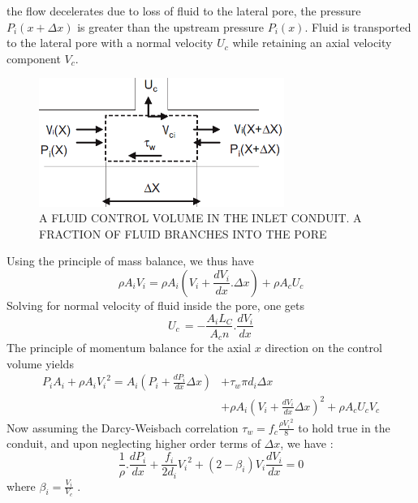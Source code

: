 \documentclass[twocolumn,10pt,cleanfoot]{ihmtc}
\begin{document}
the flow decelerates due to loss of fluid to the lateral pore, the
pressure $P_i(x+\Delta x)$ is greater than the upstream pressure
$P_i(x)$. Fluid is transported to the lateral pore with a normal
velocity $U_c$ while retaining an axial velocity component $V_c$. 
%
\begin{figure}[ht]
\centerline{\includegraphics[width=80mm,scale=0.50]{inletcon.PNG}}
\vspace{-1.5ex}
\caption{\small{A FLUID CONTROL VOLUME IN THE INLET CONDUIT. A FRACTION OF FLUID BRANCHES INTO THE PORE}}
\label{inletcon}
\vspace{-3em}
\end{figure}
%
Using the principle of mass balance, we thus
have%
\begin{equation} \label{in-mass}
\rho {{A}_{i}}{{V}_{i}}=\rho {{A}_{i}}({{V}_{i}}+\frac{d{{V}_{i}}}{dx}.\Delta x)+\rho {{A}_{c}}{{U}_{c}}
\end{equation}
%
Solving for normal velocity of fluid inside the pore, one gets
%
\begin{equation} \label{in-uc}
{{U}_{c}}\,=-\frac{{{A}_{i}}L_C}{{{A}_{c}}n}.\frac{d{{V}_{i}}}{dx} 
\end{equation}
%
The principle of momentum balance for the axial $x$ direction on the control volume yields
%
\begin{equation} \label{in-mom}
\begin{split}
{{P}_{i}}A_i+\rho {{A}_{i}}{{V}_{i}}^{2}={A}_{i}({{P}_{i}}+\frac{d{{P}_{i}}}{dx}\Delta x) & +{\tau }_{w}\pi {d}_{i}\Delta x \\
& +\rho {A}_{i}{({{V}_{i}}+\frac{d{{V}_{i}}}{dx}\Delta x)}^{2}+\rho {{A}_{c}}{{U}_{c}}{{V}_{c}}
\end{split}
\end{equation}
%
Now assuming the Darcy-Weisbach correlation ${{\tau }_{w}}=f_c\frac{\rho {{V}_{i}}^{2}}{8}$
to hold true in the conduit, and upon neglecting higher order terms
of $\Delta x$, we have :
%
\begin{equation} \label{in-mom-final}
\frac{1}{\rho }.\frac{d{{P}_{i}}}{dx}+\frac{{{f}_{i}}}{2{{d}_{i}}}{{V}_{i}}^{2}+(2-{{\beta }_{i}}){{V}_{i}}\frac{d{{V}_{i}}}{dx}=0
\end{equation} where $\beta_i=\frac{V_i}{V_c}$ . 
\end{document}
